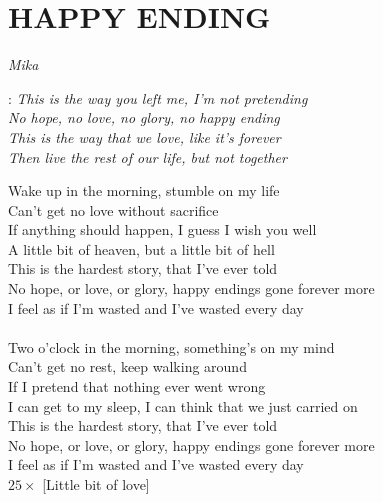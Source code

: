 \section*{\Huge HAPPY ENDING}
\emph{Mika}

\textregistered:
\emph{
This is the way you left me, I'm not pretending\\
No hope, no love, no glory, no happy ending\\
This is the way that we love, like it's forever\\
Then live the rest of our life, but not together\\
}

Wake up in the morning, stumble on my life\\
Can't get no love without sacrifice\\
If anything should happen, I guess I wish you well\\
A little bit of heaven, but a little bit of hell\\

This is the hardest story, that I've ever told\\
No hope, or love, or glory, happy endings gone forever more\\
I feel as if I'm wasted and I've wasted every day\\
\textregistered\\

Two o'clock in the morning, something's on my mind\\
Can't get no rest, keep walking around\\
If I pretend that nothing ever went wrong\\
I can get to my sleep, I can think that we just carried on\\

This is the hardest story, that I've ever told\\
No hope, or love, or glory, happy endings gone forever more\\
I feel as if I'm wasted and I've wasted every day\\

\textregistered \hspace{1cm} $25 \times$ [Little bit of love] \hspace{1cm} \textregistered

\newpage
